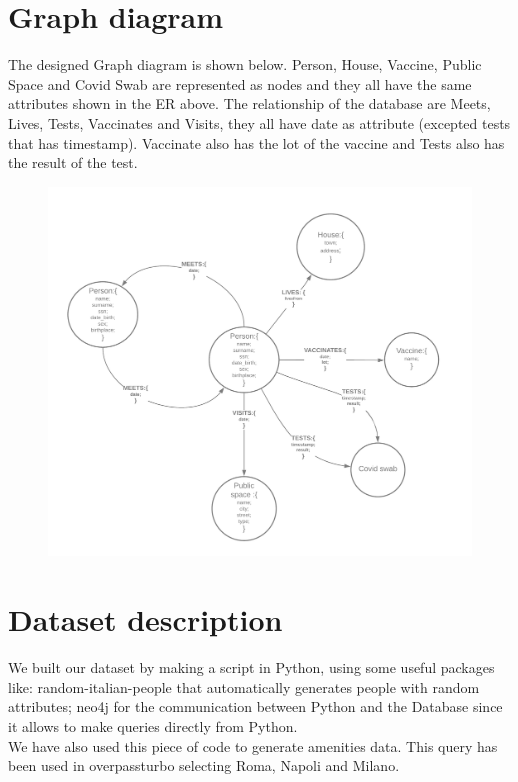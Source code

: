 \documentclass{article}
\begin{document}
\section{Graph diagram}
The designed Graph diagram is shown below. Person, House, Vaccine, Public Space and Covid Swab are represented as nodes and they all have the same attributes shown in the ER above. The relationship of the database are Meets, Lives, Tests, Vaccinates and Visits, they all have date as attribute (excepted tests that has timestamp). Vaccinate also has the lot of the vaccine and Tests also has the result of the test.

\begin{figure} [h]
\centering 
\includegraphics[scale=0.15]{Graph_diagram.png} 
\end{figure}
\newpage

\section{Dataset description}
We built our dataset by making a script in Python, using some useful packages like: random-italian-people that automatically generates people with random attributes; neo4j for the communication between Python and the Database since it allows to make queries directly from Python. 
\\
We have also used this piece of code to generate amenities data. This query has been used in overpassturbo selecting Roma, Napoli and Milano.
\end{document}
